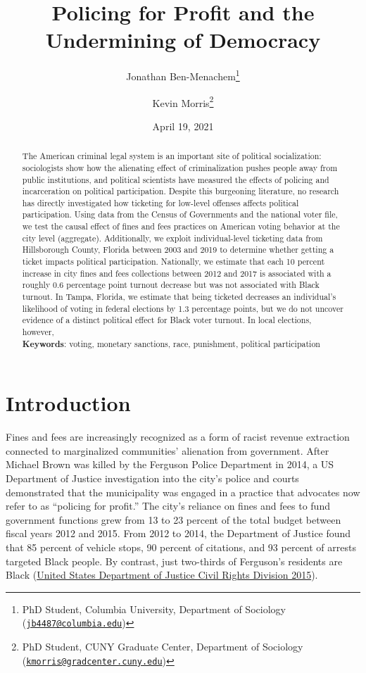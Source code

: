 \documentclass[
  12pt,
]{article}
\title{Policing for Profit and the Undermining of Democracy}
\author{Jonathan Ben-Menachem\footnote{PhD Student, Columbia University, Department of Sociology (\href{mailto:jb4487@columbia.edu}{\nolinkurl{jb4487@columbia.edu}})} \and Kevin Morris\footnote{PhD Student, CUNY Graduate Center, Department of Sociology (\href{mailto:kmorris@gradcenter.cuny.edu}{\nolinkurl{kmorris@gradcenter.cuny.edu}})}}
\date{April 19, 2021}
\begin{document}
\maketitle
\begin{abstract}
The American criminal legal system is an important site of political socialization: sociologists show how the alienating effect of criminalization pushes people away from public institutions, and political scientists have measured the effects of policing and incarceration on political participation. Despite this burgeoning literature, no research has directly investigated how ticketing for low-level offenses affects political participation. Using data from the Census of Governments and the national voter file, we test the causal effect of fines and fees practices on American voting behavior at the city level (aggregate). Additionally, we exploit individual-level ticketing data from Hillsborough County, Florida between 2003 and 2019 to determine whether getting a ticket impacts political participation. Nationally, we estimate that each 10 percent increase in city fines and fees collections between 2012 and 2017 is associated with a roughly 0.6 percentage point turnout decrease but was not associated with Black turnout. In Tampa, Florida, we estimate that being ticketed decreases an individual's likelihood of voting in federal elections by 1.3 percentage points, but we do not uncover evidence of a distinct political effect for Black voter turnout. In local elections, however,\\
\textbar{}
\textbar{}
\textbf{Keywords}: voting, monetary sanctions, race, punishment, political participation
\end{abstract}

\pagebreak

\doublespacing

\hypertarget{introduction}{%
\section*{Introduction}\label{introduction}}

Fines and fees are increasingly recognized as a form of racist revenue extraction connected to marginalized communities' alienation from government. After Michael Brown was killed by the Ferguson Police Department in 2014, a US Department of Justice investigation into the city's police and courts demonstrated that the municipality was engaged in a practice that advocates now refer to as ``policing for profit.'' The city's reliance on fines and fees to fund government functions grew from 13 to 23 percent of the total budget between fiscal years 2012 and 2015. From 2012 to 2014, the Department of Justice found that 85 percent of vehicle stops, 90 percent of citations, and 93 percent of arrests targeted Black people. By contrast, just two-thirds of Ferguson's residents are Black (\protect\hyperlink{ref-UnitedStatesDepartmentofJusticeCivilRightsDivision2015}{United States Department of Justice Civil Rights Division 2015}).
\end{document}
